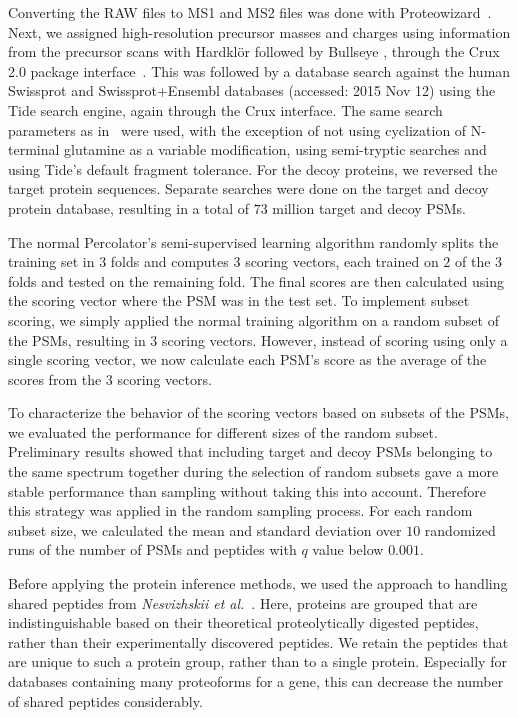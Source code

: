 \documentclass{article}
\begin{document}
Converting the RAW files to MS1 and MS2 files was done with
Proteowizard~\cite{kessner2008}. Next, we assigned high-resolution
precursor masses and charges using information from the precursor
scans with Hardkl\"{o}r \cite{hoopmann2007} followed by Bullseye
\cite{hsieh2009}, through the Crux 2.0 package
interface~\cite{mcilwain2014}. This was followed by a database search
against the human Swissprot and Swissprot+Ensembl databases
(accessed: 2015 Nov 12) using the Tide search engine, again through
the Crux interface. The same search parameters as
in~\cite{kim2014draft} were used, with the exception of not
using cyclization of N-terminal glutamine as a variable modification,
using semi-tryptic searches and using Tide's default fragment
tolerance. For the decoy proteins, we reversed the target
protein sequences. Separate searches were done on the target and decoy
protein database, resulting in a total of $73$ million target and
decoy PSMs.

The normal Percolator's semi-supervised learning algorithm randomly
splits the training set in $3$ folds and computes $3$ scoring vectors,
each trained on $2$ of the $3$ folds and tested on the remaining
fold. The final scores are then calculated using the scoring vector
where the PSM was in the test set. To implement subset scoring, we
simply applied the normal training algorithm on a random subset of the
PSMs, resulting in $3$ scoring vectors. However, instead
of scoring using only a single scoring vector, we now calculate each
PSM's score as the average of the scores from the $3$ scoring vectors.

To characterize the behavior of the scoring vectors based on subsets
of the PSMs, we evaluated the performance for different sizes of the
random subset. Preliminary results showed that including target and
decoy PSMs belonging to the same spectrum together during the
selection of random subsets gave a more stable performance than
sampling without taking this into account. Therefore this strategy was
applied in the random sampling process. For each random subset
size, we calculated the mean and standard deviation over $10$
randomized runs of the number of PSMs and peptides with $q$ value
below $0.001$.

Before applying the protein inference methods, we used the approach to
handling shared peptides from {\em Nesvizhskii et
al.}~\cite{nesvizhskii2003statistical}. Here, proteins are grouped
that are indistinguishable based on their theoretical proteolytically
digested peptides, rather than their experimentally discovered
peptides. We retain the peptides that are unique to such a protein
group, rather than to a single protein. Especially for databases
containing many proteoforms for a gene, this can decrease the number
of shared peptides considerably.
\end{document}

